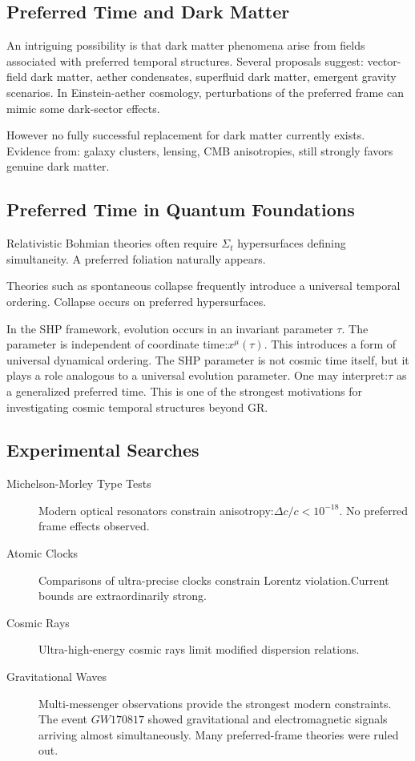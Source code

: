\subsection{ Preferred Time and Dark Matter}
An intriguing possibility is that dark matter phenomena arise from fields associated with preferred temporal structures.
Several proposals suggest:
vector-field dark matter,
aether condensates,
superfluid dark matter,
emergent gravity scenarios.
In Einstein-aether cosmology, perturbations of the preferred frame can mimic some dark-sector effects.

However no fully successful replacement for dark matter currently exists.
Evidence from:
galaxy clusters,
lensing,
CMB anisotropies,
still strongly favors genuine dark matter.

\subsection{Preferred Time in Quantum Foundations}
Relativistic Bohmian theories often require $ \Sigma_t $
hypersurfaces defining simultaneity.
A preferred foliation naturally appears.

Theories such as spontaneous collapse frequently introduce a universal temporal ordering.
Collapse occurs on preferred hypersurfaces.

In the SHP framework, evolution occurs in an invariant parameter
$ \tau $. The parameter is independent of coordinate time:$ x^\mu(\tau). $
This introduces a form of universal dynamical ordering.
The SHP parameter is not cosmic time itself, but it plays a role analogous
to a universal evolution parameter.
One may interpret:$ \tau $
as a generalized preferred time.
This is one of the strongest motivations for investigating cosmic temporal
structures beyond GR.

\subsection{ Experimental Searches}
\begin{description}
    \item [Michelson-Morley Type Tests ] Modern optical resonators constrain anisotropy:$ \Delta c/c<10^{-18} .$ No preferred frame effects observed.
    \item [Atomic Clocks ] Comparisons of ultra-precise clocks constrain Lorentz violation.Current bounds are extraordinarily strong.
    \item [Cosmic Rays ] Ultra-high-energy cosmic rays limit modified dispersion relations.
    \item [Gravitational Waves ] Multi-messenger observations provide the
        strongest modern constraints. The event $GW170817$ showed
        gravitational and electromagnetic signals
arriving almost simultaneously.
Many preferred-frame theories were ruled out.
\end{description}
